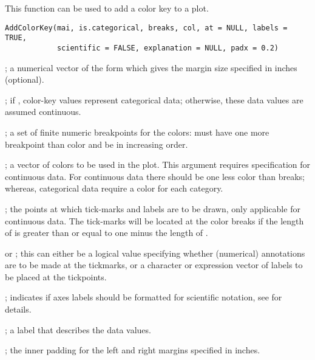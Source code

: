 \documentclass[letterpaper]{book}
\begin{document}
%
\begin{Description}\relax
This function can be used to add a color key to a plot.
\end{Description}
%
\begin{Usage}
\begin{verbatim}
AddColorKey(mai, is.categorical, breaks, col, at = NULL, labels = TRUE,
            scientific = FALSE, explanation = NULL, padx = 0.2)
\end{verbatim}
\end{Usage}
%
\begin{Arguments}
\begin{ldescription}
\item[\code{mai}] ; a numerical vector of the form  which gives the margin size specified in inches (optional).
\item[\code{is.categorical}] ; if , color-key values represent categorical data; otherwise, these data values are assumed continuous.
\item[\code{breaks}] ; a set of finite numeric breakpoints for the colors: must have one more breakpoint than color and be in increasing order.
\item[\code{col}] ; a vector of colors to be used in the plot.
This argument requires  specification for continuous data.
For continuous data there should be one less color than breaks; whereas, categorical data require a color for each category.
\item[\code{at}] ; the points at which tick-marks and labels are to be drawn, only applicable for continuous data.
The tick-marks will be located at the color breaks if the length of  is greater than or equal to one minus the length of .
\item[\code{labels}]  or ; this can either be a logical value specifying whether (numerical) annotations are to be made at the tickmarks, or a character or expression vector of labels to be placed at the tickpoints.
\item[\code{scientific}] ; indicates if axes labels should be formatted for scientific notation, see  for details.
\item[\code{explanation}] ; a label that describes the data values.
\item[\code{padx}] ; the inner padding for the left and right margins specified in inches.
\end{ldescription}
\end{Arguments}
\end{document}
